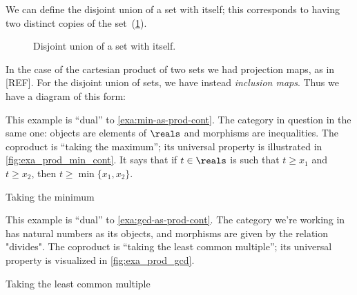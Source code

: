 We can define the disjoint union of a set with itself; this corresponds to having two distinct copies of the set~(\cref{fig:disjointself}).

\begin{figure}[h!]
  \begin{center}
    \caption{Disjoint union of a set with itself.}
    \label{fig:disjointself}
  \end{center}
\end{figure}

In the case of the cartesian product of two sets we had projection maps, as in [REF]. For the disjoint union of sets, we have instead \emph{inclusion maps}. Thus we have a diagram of this form:


  \begin{figure}[h!]
  \begin{center}
  \end{center}
    \label{fig:coprod_disunion_diagram}
  \end{figure}


\begin{example}\label{exa:min-as-prod-cont-to-rename}
This example is ``dual'' to \cref{exa:min-as-prod-cont}. The category in question in the same one: objects are elements of $\reals$ and morphisms are inequalities.
The coproduct is ``taking the maximum''; its universal property is illustrated in \cref{fig:exa_prod_min_cont}. It says that if $t \in \reals$ is such that $t \geq x_1$ and $t \geq x_2$, then $t \geq \min \{ x_1, x_2 \}$.
  \begin{marginfigure}
  \begin{center}
  \end{center}
    \caption{Taking the minimum}
    \label{fig:exa_coprod_max_cont}
  \end{marginfigure}
\end{example}

\begin{example}\label{exa:lcm-as-coprod-cont}
This example is ``dual'' to \cref{exa:gcd-as-prod-cont}. The category we're working in has natural numbers as its objects, and morphisms are given by the relation "divides".
The coproduct is ``taking the least common multiple''; its universal property is visualized in \cref{fig:exa_prod_gcd}.
  \begin{marginfigure}
  \begin{center}
  \end{center}
    \caption{Taking the least common multiple}
    \label{fig:exa_coprod_lcm_cont}
  \end{marginfigure}
\end{example}

